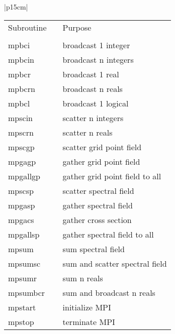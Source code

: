 \begin{center}
\begin{tabular}{|p{15cm}|}
\begin{center}
\begin{tabular}{l p{2cm} l}
Subroutine & &Purpose \\
&& \\
{\sub mpbci} && broadcast 1 integer \\
{\sub mpbcin} & &broadcast n integers \\
{\sub mpbcr} & &broadcast 1 real \\
{\sub mpbcrn} & &broadcast n reals \\
{\sub mpbcl} && broadcast 1 logical \\
{\sub mpscin} & &scatter n integers \\
{\sub mpscrn} && scatter n reals \\
{\sub mpscgp} && scatter grid point field \\
{\sub mpgagp} && gather grid point field \\
{\sub mpgallgp} && gather grid point field to all \\
{\sub mpscsp} & &scatter spectral field \\
{\sub mpgasp} && gather spectral field \\
{\sub mpgacs} && gather cross section \\
{\sub mpgallsp} && gather spectral field to all \\
{\sub mpsum} && sum spectral field \\
{\sub mpsumsc} && sum and scatter spectral field \\
{\sub mpsumr} && sum n reals \\
{\sub mpsumbcr}& & sum and broadcast n reals \\
{\sub mpstart} & &initialize MPI \\
{\sub mpstop} & &terminate MPI \\
\end{tabular}
\end{center}
\vspace{3mm} \\
\hline
\end{tabular}
\end{center}

\newpage


